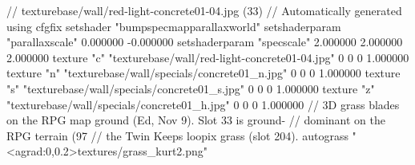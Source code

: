 // texturebase/wall/red-light-concrete01-04.jpg (33)
// Automatically generated using cfgfix
setshader "bumpspecmapparallaxworld"
setshaderparam "parallaxscale" 0.000000 -0.000000
setshaderparam "specscale" 2.000000 2.000000 2.000000
texture "c" "texturebase/wall/red-light-concrete01-04.jpg" 0 0 0 1.000000
texture "n" "texturebase/wall/specials/concrete01_n.jpg" 0 0 0 1.000000
texture "s" "texturebase/wall/specials/concrete01_s.jpg" 0 0 0 1.000000
texture "z" "texturebase/wall/specials/concrete01_h.jpg" 0 0 0 1.000000
// 3D grass blades on the RPG map ground (Ed, Nov 9). Slot 33 is ground-
// dominant on the RPG terrain (97%
// the Twin Keeps loopix grass (slot 204).
autograss "<agrad:0,0.2>textures/grass_kurt2.png"
